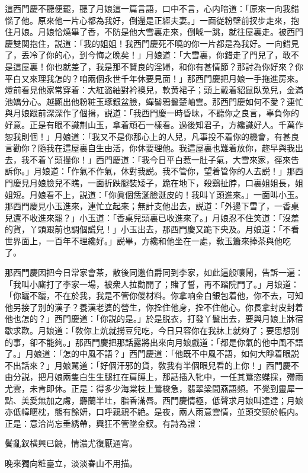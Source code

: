 這西門慶不聽便罷，聽了月娘這一篇言語，口中不言，心内暗道：「原來一向我錯惱了他。原來他一片心都為我好，倒還是正經夫妻。」一面従粉壁前扠步走來，抱住月娘。月娘恰燒畢了香，不防是他大雪裏走來，倒唬一跳，就往屋裏走。被西門慶雙関抱住，説道：「我的姐姐！我西門慶死不曉的你一片都是為我好。一向錯見了，丢冷了你的心，到今悔之晚矣！」月娘道：「大雪裏，你錯走了門兒了，敢不是這屋裏！你也就差了，我是那不賢良的淫婦，和你有甚情節？那討為你好來？你平白又來理我怎的？咱兩個永世千年休要見面！」那西門慶把月娘一手拖進房來。燈前看見他家常穿着：大紅潞紬對衿襖兒，軟黄裙子；頭上戴着貂鼠臥兔兒，金滿池嬌分心。越顯出他粉粧玉琢銀盆臉，蟬髻鴉鬟楚岫雲。那西門慶如何不愛？連忙與月娘跟前深深作了個揖，説道：「我西門慶一時昏昧，不聽你之良言，辜負你的好意。正是有眼不識荆山玉，拿着頑石一樣看。過後知君子，方纔識好人。千萬作恕我則個！」月娘道：「我又不是你那心上的人兒，凡事投不着你的機會，有甚良言勸你？隨我在這屋裏自生由活，你休要理他。我這屋裏也難着放你，趂早與我出去，我不着丫頭攆你！」西門慶道：「我今日平白惹一肚子氣，大雪來家，徑來告訴你。」月娘道：「作氣不作氣，休對我説。我不管你，望着管你的人去説！」那西門慶見月娘臉兒不瞧，一面折跌腿裝矮子，跪在地下，殺鷄扯脖，口裏姐姐長，姐姐短。月娘看不上，説道：「你眞個恁涎臉涎皮的！我叫丫頭進來。」一面叫小玉。那西門慶見小玉進來，連忙立起來；無計支他出去，説道：「外邊下雪了，一香桌兒還不收進來罷？」小玉道：「香桌兒頭裏已收進來了。」月娘忍不住笑道：「沒羞的貨，丫頭跟前也調個謊兒！」小玉出去，那西門慶又跪下央及。月娘道：「不看世界面上，一百年不理纔好。」説畢，方纔和他坐在一處，敎玉簫來捧茶與他吃了。

那西門慶因把今日常家會茶，散後同邀伯爵同到李家，如此這般嚷鬧，告訴一遍：「我叫小廝打了李家一場，被衆人拉勸開了；賭了誓，再不踏院門了。」月娘道：「你躧不躧，不在於我，我是不管你儍材料。你拿响金白銀包着他，你不去，可知他另接了別的漢子？養漢老婆的營生，你拴住他身，拴不住他心。你長拿封皮封着他也怎的？」西門慶道：「你説的是。」於是脱衣，打發丫鬟出去，要與月娘上牀宿歇求歡。月娘道：「敎你上炕就撈豆兒吃，今日只容你在我牀上就夠了；要思想别的事，卻不能夠。」那西門慶把那話露將出來向月娘戲道：「都是你氣的他中風不語了。」月娘道：「怎的中風不語？」西門慶道：「他既不中風不語，如何大睜着眼説不出話來？」月娘駡道：「好個汗邪的貨，敎我有半個眼兒看的上你！」西門慶不由分説，把月娘兩隻白生生腿扛在肩膊上，那話插入牝中，一任其鶯恣蝶採，殢雨尤雲，未肯即休。正是：得多少海棠枝上鶯梭急，翡翠梁間燕語頻。不覺到靈犀一點、美愛無加之䖏，麝蘭半吐，脂香滿唇。西門慶情極，低聲求月娘叫達達；月娘亦低幃暱枕，態有餘妍，口呼親親不絶。是夜，兩人雨意雲情，並頭交頸於帳内。正是：意洽尚忘垂綉帶，興狂不管墜金釵。有詩為證：

\begin{myquote}
鬢亂釵横興已饒，情濃尤復厭通宵。

晚來獨向粧臺立，淡淡春山不用描。
\end{myquote}

